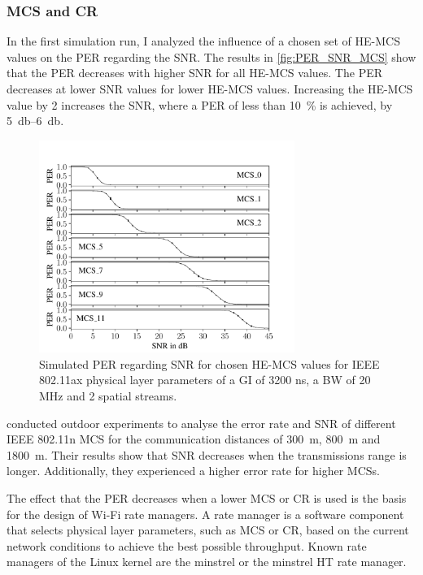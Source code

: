 \subsubsection*{\acf{MCS} and \acf{CR}}
In the first simulation run, I analyzed the influence of a chosen set of \ac{HE}-\ac{MCS} values on the \ac{PER} regarding the \ac{SNR}.
The results in \autoref{fig:PER_SNR_MCS} show that the \ac{PER} decreases with higher \ac{SNR} for all \ac{HE}-\ac{MCS} values. The
\ac{PER} decreases at lower \ac{SNR} values for lower \ac{HE}-\ac{MCS} values. Increasing the \ac{HE}-\ac{MCS} value by \num{2} increases the \ac{SNR}, where a \ac{PER} of less than
\SI{10}{\percent} is achieved, by \SIrange{5}{6}{\decibel}.
\begin{figure}[H]%
   \centering
   \includegraphics[width=0.74\textwidth]{figures/MCS_PER_to_SNR.pdf}
   \caption{Simulated \ac{PER} regarding SNR for chosen \acf{HE}-\acf{MCS} values for IEEE 802.11ax physical layer parameters
         of a GI of 3200 ns, a \ac{BW} of 20 MHz and \num{2} spatial streams.}
   \label{fig:PER_SNR_MCS}%
\end{figure}
\textcite{paul_characterizing_2011} conducted outdoor experiments to analyse the error rate and \ac{SNR} of different IEEE 802.11n \ac{MCS} for the
communication distances of \SI{300}{\meter}, \SI{800}{\meter} and \SI{1800}{\meter}. Their results show that \ac{SNR} decreases when the transmissions range is longer.
Additionally, they experienced a higher error rate for higher \acp{MCS}.

The effect that the \ac{PER} decreases when a lower \ac{MCS} or \ac{CR} is used is the basis for the design of Wi-Fi rate managers.
A rate manager is a software component that selects physical layer parameters, such as \ac{MCS} or \ac{CR}, based on the current network conditions to
achieve the best possible throughput. Known rate managers of the Linux kernel are the minstrel or the minstrel \ac{HT} rate manager.

